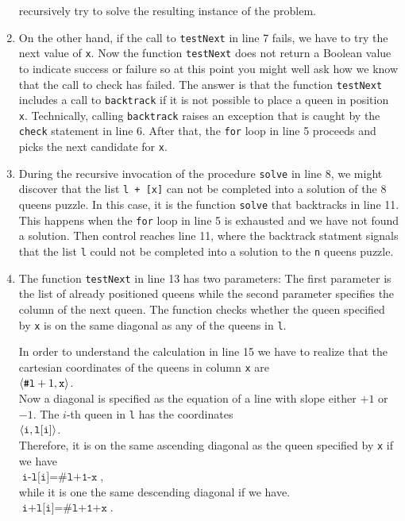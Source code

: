 \begin{enumerate}
      recursively try to solve the resulting instance of the problem.
\item On the other hand, if the call to \texttt{testNext} in line 7 fails, we have to try
      the next value of \texttt{x}.  Now the function \texttt{testNext} does not return a 
      Boolean value to indicate success or failure so at this point you might well
      ask how we know that the call to check has failed.  The answer is that the function
      \texttt{testNext} includes a call to \texttt{backtrack} if it is not possible to
      place a queen in position \texttt{x}.  Technically, calling \texttt{backtrack}
      raises an exception that is caught by the \texttt{check} statement in line 6.
      After that,  the \texttt{for} loop in line 5 proceeds and picks the next
      candidate for \texttt{x}.
\item During the recursive invocation of the procedure \texttt{solve} in line 8, we might
      discover that the list \texttt{l + [x]} can not be completed into a solution of the 8
      queens puzzle.   In this case, it is the function \texttt{solve} that backtracks
      in line 11.  This happens when the \texttt{for} loop in line 5 is exhausted and we
      have not found a solution.  Then
      control  reaches line 11, where the backtrack statment  signals that the list \texttt{l}
      could not be completed into a solution to the \texttt{n} queens puzzle.
\item The function \texttt{testNext} in line 13 has two parameters:  The first parameter is the list
      of already positioned queens while the second parameter specifies the column of the next
      queen.  The function checks whether the queen specified by \texttt{x} is on the same
      diagonal as any of the queens in \texttt{l}.
      
      In order to understand the calculation in line 15 we have to realize that the
      cartesian coordinates of the queens in column \texttt{x} are 
      \\[0.2cm]
      \hspace*{1.3cm}
      $\pair(\texttt{\#l}+1, \mathtt{x})$.
      \\[0.2cm]
      Now a diagonal is specified as the equation of a line with slope either $+1$ or $-1$.
      The $i$-th  queen in \texttt{l} has the coordinates
      \\[0.2cm]
      \hspace*{1.3cm}
      $\pair(\texttt{i}, \mathtt{l[i]})$.      
      \\[0.2cm]
      Therefore, it is on the same ascending diagonal as the queen specified by \texttt{x} if
      we have
      \\[0.2cm]
      \hspace*{1.3cm}
      $\texttt{i-l[i]} = \texttt{\#l+1-x}$,
      \\[0.2cm]
      while it is one the same descending diagonal if we have.
      \\[0.2cm]
      \hspace*{1.3cm}
      $\texttt{i+l[i]} = \texttt{\#l+1+x}$.
\end{enumerate}

